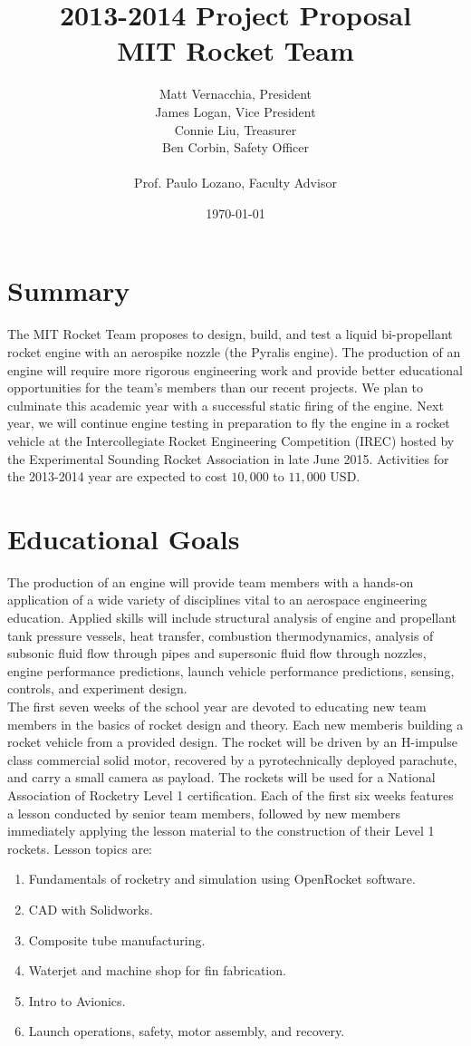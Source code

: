 \documentclass{article}
\title{ 2013-2014 Project Proposal \\ MIT Rocket Team} %
\author{Matt Vernacchia, President\\James Logan, Vice President\\Connie Liu, Treasurer\\Ben Corbin, Safety Officer
\\\\ Prof. Paulo Lozano, Faculty Advisor} %
\date{ \today } %
\begin{document}
\maketitle
\section*{Summary}
The MIT Rocket Team proposes to design, build, and test a liquid bi-propellant rocket engine with an aerospike nozzle (the Pyralis engine).
The production of an engine will require more rigorous engineering work and provide better educational opportunities for the team's members than our recent projects. We plan to culminate this academic year with a successful static firing of the engine. Next year, we will continue engine testing in preparation to fly the engine in a rocket vehicle at the Intercollegiate Rocket Engineering Competition (IREC) hosted by the Experimental Sounding Rocket Association in late June 2015. Activities for the 2013-2014 year are expected to cost $10,000$ to $11,000$ USD.
\section*{Educational Goals}
The production of an engine will provide team members with a hands-on application of a wide variety of disciplines vital to an aerospace engineering education. Applied skills will include structural analysis of engine and propellant tank pressure vessels, heat transfer, combustion thermodynamics, analysis of subsonic fluid flow through pipes and supersonic fluid flow through nozzles, engine performance predictions, launch vehicle performance predictions, sensing, controls, and experiment design.\\

The first seven weeks of the school year are devoted to educating new team members in the basics of rocket design and theory. Each new memberis building a rocket vehicle from a provided design. The rocket will be driven by an H-impulse class commercial solid motor, recovered by a pyrotechnically deployed parachute, and carry a small camera as payload. The rockets will be used for a National Association of Rocketry Level 1 certification. Each of the first six weeks features a lesson conducted by senior team members, followed by new members immediately applying the lesson material to the construction of their Level 1 rockets. Lesson topics are:
\begin{enumerate}
\item Fundamentals of rocketry and simulation using OpenRocket software.
\item CAD with Solidworks.
\item Composite tube manufacturing.
\item Waterjet and machine shop for fin fabrication.
\item Intro to Avionics.
\item Launch operations, safety, motor assembly, and recovery.
\end{enumerate}
\end{document}
